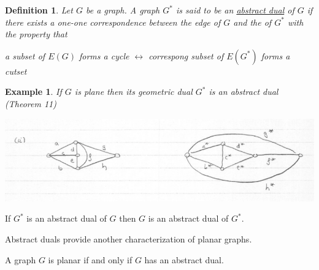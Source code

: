 \documentclass[12pt]{article}
\newenvironment{theorem}[1]{%
  \renewcommand\themanualtheoreminner{#1}%
  \manualtheoreminner
}{\endmanualtheoreminner}
\newtheorem{example}{Example}
\newtheorem{definition}{Definition}
\begin{document}
\begin{definition}
	Let $G$ be a graph. A graph $G^{*}$ is said to be an \underline{abstract dual} of $G$ if there exists a one-one correspondence between the edge of $G$ and the of $G^{*}$ with the property that

	a subset of $E(G)$ forms a cycle $\leftrightarrow$ correspong subset of $E(G^{*})$ forms a cutset
\end{definition}

\begin{example}
	If $G$ is plane then its geometric dual $G^{*}$ is an abstract dual (Theorem 11)
	\begin{center}
		\includegraphics[scale=0.5]{dual2}
	\end{center}

\end{example}


\begin{theorem}{14}
	If $G^{*}$ is an abstract dual of $G$ then $G$ is an abstract dual of $G^{*}$.

	Abstract duals provide another characterization of planar graphs.
\end{theorem}

\begin{theorem}{15}
	A graph $G$ is planar if and only if $G$ has an abstract dual.
\end{theorem}
\end{document}
